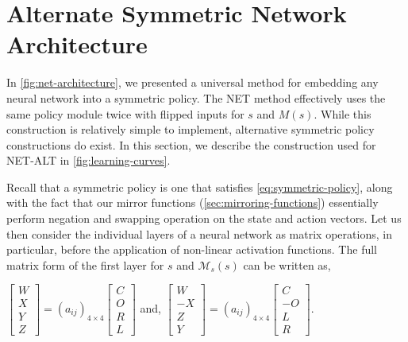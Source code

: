 \section{Alternate Symmetric Network Architecture}
\label{sec:alternate-network}

In \autoref{fig:net-architecture}, we presented a universal method for embedding any neural network into a symmetric policy.  The NET method effectively uses the same policy module twice with flipped inputs for $s$ and $M(s)$.  While this construction is relatively simple to implement, alternative symmetric policy constructions do exist.  In this section, we describe the construction used for NET-ALT in \autoref{fig:learning-curves}.



Recall that a symmetric policy is one that satisfies \autoref{eq:symmetric-policy}, along with the fact that our mirror functions (\autoref{sec:mirroring-functions}) essentially perform negation and swapping operation on the state and action vectors.  Let us then consider the individual layers of a neural network as matrix operations, in particular, before the application of non-linear activation functions.  The full matrix form of the first layer for $s$ and $\mathcal{M}_s(s)$ can be written as,

\begin{center}
$\begin{bmatrix} W \\ X \\ Y \\ Z  \end{bmatrix} = (a_{ij})_{4\times4} \begin{bmatrix} C \\ O \\ R \\ L \end{bmatrix}$ and, $\begin{bmatrix} W \\ -X \\ Z \\ Y  \end{bmatrix} = (a_{ij})_{4\times4} \begin{bmatrix} C \\  -O \\  L \\ R \end{bmatrix}$.
\end{center}

